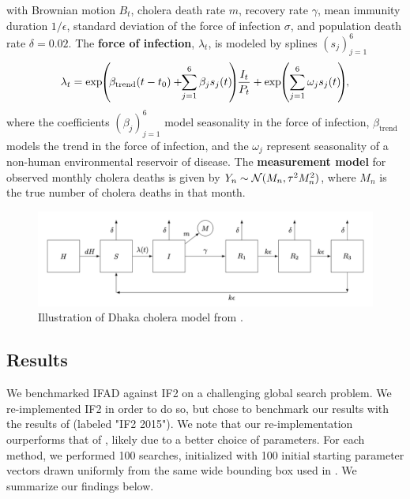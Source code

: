 \documentclass[9pt,twocolumn,twoside]{pnas-new}
\begin{document}
with Brownian motion $B_t$, cholera death rate $m$, recovery rate $\gamma$, mean immunity duration $1/\epsilon$, standard deviation of the force of infection $\sigma$, and population death rate $\delta=0.02$. The \textbf{force of infection}, $\lambda_t$, is modeled by splines $(s_j)_{j=1}^6$
\vspace*{-2mm}
\begin{equation*}
    \lambda_t=\exp\hspace{-1mm}\left(\hspace{-.5mm}\beta_{\text{trend}}(t-t_0)+\hspace{-1mm}\sum_{j=1}^{6} \beta_j s_j(t)\hspace{-1mm}\right)\hspace{-1mm}\frac{I_t}{P_t} + \exp\hspace{-1mm} \left(\sum_{j=1}^{6} \omega_j s_j(t)\hspace{-1mm}\right)\hspace{-1mm},
    \vspace*{-2mm}
\end{equation*}
where the coefficients $(\beta_j)_{j=1}^6$ model seasonality in the force of infection, $\beta_{\text{trend}}$ models the trend in the force of infection, and the $\omega_j$ represent seasonality of a non-human environmental reservoir of disease. The \textbf{measurement model} for observed monthly cholera deaths is given by 
    $Y_n \sim {\mathcal{N}}(M_n, \tau^2M_n^2)$,
where $M_n$ is the true number of cholera deaths in that month.

\begin{figure}
    \centering
    \includegraphics[width=\textwidth/2]{../imgs/095/tikzcholera.png}
    \vspace*{-7mm}
    \caption{Illustration of Dhaka cholera model from \cite{king08}.}
    \label{fig:tikz-cholera}
\end{figure}

\subsection{Results}

We benchmarked IFAD against IF2 on a challenging global search problem. We re-implemented IF2 in order to do so, but chose to benchmark our results with the results of \cite{ionides15} (labeled "IF2 2015"). We note that our re-implementation ourperforms that of \cite{ionides15}, likely due to a better choice of parameters. For each method, we performed 100 searches, initialized with 100 initial starting parameter vectors drawn uniformly from the same wide bounding box used in \cite{ionides15}. We summarize our findings below. 
\end{document}
